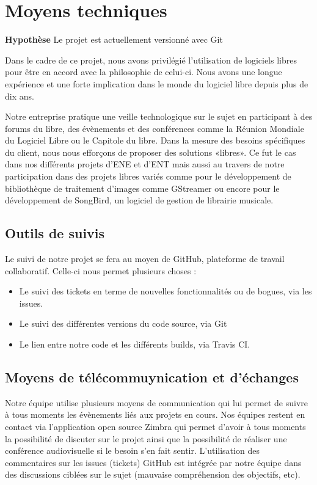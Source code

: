 \section{Moyens techniques}

\begin{exemple}
\textbf{Hypothèse} Le projet \correlyce{} est actuellement versionné avec Git 
\end{exemple}

Dans le cadre de ce projet, nous avons privilégié l’utilisation de logiciels libres pour être en accord avec la philosophie de celui-ci. 
Nous avons une longue expérience et une forte implication dans le monde du logiciel libre depuis plus de dix ans.

Notre entreprise pratique une veille technologique sur le sujet en participant à des forums du libre, des évènements et des conférences comme la Réunion Mondiale du Logiciel Libre ou le Capitole du libre. \newline
Dans la mesure des besoins spécifiques du client, nous nous efforçons de proposer des solutions «libres».  Ce fut le cas dans nos différents projets d’ENE et d’ENT mais aussi au travers de notre participation dans des projets libres variés comme pour le développement de bibliothèque de traitement d’images comme GStreamer ou encore pour le développement de SongBird, un logiciel de gestion de librairie musicale. 

	\subsection{Outils de suivis}
	Le suivi de notre projet se fera au moyen de GitHub, plateforme de travail collaboratif. Celle-ci nous permet plusieurs choses : 
	
	\begin{itemize}
		\item Le suivi des tickets en terme de nouvelles fonctionnalités ou de bogues, via les issues.
		\item Le suivi des différentes versions du code source, via Git
		\item Le lien entre notre code et les différents builds, via Travis CI.
	\end{itemize}
		
	\subsection{Moyens de télécommuynication et d'échanges}
	Notre équipe utilise plusieurs moyens de communication qui lui permet de suivre à tous moments les évènements liés aux projets en cours. Nos équipes restent en contact via l’application open source Zimbra qui permet d’avoir à tous moments la possibilité de discuter sur le projet ainsi que la possibilité de réaliser une conférence audiovisuelle si le besoin s’en fait sentir.
	L’utilisation des commentaires sur les issues (tickets) GitHub est intégrée par notre équipe dans des discussions ciblées sur le sujet (mauvaise compréhension des objectifs, etc).
	
